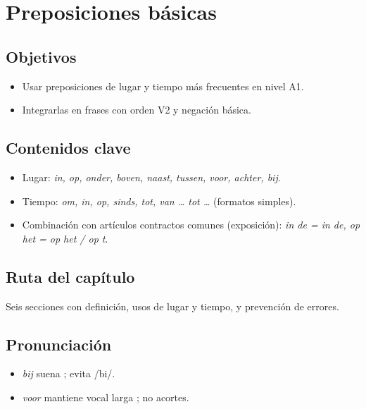 \chapter{Preposiciones básicas}
\section{Objetivos}
\begin{itemize}[leftmargin=*]
	\item Usar preposiciones de lugar y tiempo más frecuentes en nivel A1.
	\item Integrarlas en frases con orden V2 y negación básica.
\end{itemize}

\section{Contenidos clave}
\begin{itemize}[leftmargin=*]
	\item Lugar: \textit{in, op, onder, boven, naast, tussen, voor, achter, bij}.
	\item Tiempo: \textit{om, in, op, sinds, tot, van \ldots{} tot \ldots{}} (formatos simples).
	\item Combinación con artículos contractos comunes (exposición): \textit{in de = in de, op het = op het / op \textquotesingle{}t}.
\end{itemize}

\section{Ruta del capítulo}
Seis secciones con definición, usos de lugar y tiempo, y prevención de errores.








\section{Pronunciación}
\begin{itemize}[leftmargin=*]
	\item \textit{bij} suena ; evita /bi/.
	\item \textit{voor} mantiene vocal larga ; no acortes.
\end{itemize}

